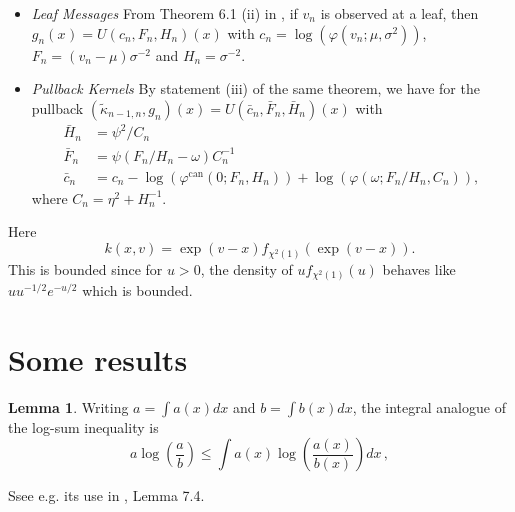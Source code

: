 \documentclass[11pt,reqno]{amsart}
\theoremstyle{definition}
\newtheorem{lem}[thm]{Lemma}
\newcommand{\gfunx}[2]{g_{#1}\left(x_{#2}\right)}
\newcommand{\Ufunx}[2]{U\left(c_{#1}^{#2}, F_{#1}^{#2}, H_{#1}^{#2}\right)(x)}
\newcommand{\Ubarx}[2]{U\left(\bar{c}_{#1}^{#2}, \bar{F}_{#1}^{#2}, \bar{H}_{#1}^{#2}\right)(x)}
\newcommand{\pullbacktil}[2]{\left(\tilde{\kappa}_{#1, #2}, g_{#2}\right)(x)}
\begin{document}
\begin{itemize}
	\item {\it Leaf Messages} From Theorem 6.1 (ii) in \cite{bffg}, if $v_n$ is observed at a leaf, then $\gfunx{n}{} = \Ufunx{n}{}$ with $c_n = \log\left(\varphi(v_n; \mu, \sigma^2)\right)$, $F_n = (v_n - \mu) \sigma^{-2}$ and $H_n = \sigma^{-2}$.
	\item {\it Pullback Kernels} By statement (iii) of the same theorem, we have for the pullback $\pullbacktil{n - 1}{n} = \Ubarx{n}{}$ with 
 \begin{align*}
	 \bar{H}_n &= \psi^2 / C_n \\ \bar{F}_n &= \psi (F_n/H_n - \omega) C_n^{-1} \\ \bar{c}_n &= c_n - \log\left(\varphi^{\text{can}}(0; F_n, H_n)\right) + \log\left(\varphi(\omega; F_n/H_n, C_n)\right),
	\end{align*}
	where $	C_n = \eta^2 + H_n^{-1}$.
\end{itemize}


Here 
\[ k(x,v)= \exp\left(v-x\right) f_{\chi^2(1)}(\exp(v-x)). \]
This is bounded since for $u>0$, the density of $u f_{\chi^2(1)}(u)$ behaves like 
$u u^{-1/2} e^{-u/2}$ which is bounded.
%

\appendix
\section{Some results}

\begin{lem}\label{lem:logsumineq}
Writing $a = \int a(x) dx$ and $b = \int b(x) dx$, the integral analogue of the log-sum inequality is
\[
 a \log\left(\frac{a}{b}\right) \leq \int a(x) \log \left(\frac{a(x)}{b(x)}\right) dx  \, ,
\]
	\end{lem}
Ssee e.g. its use in \cite{csiszar2004information}, Lemma 7.4.
\end{document}
